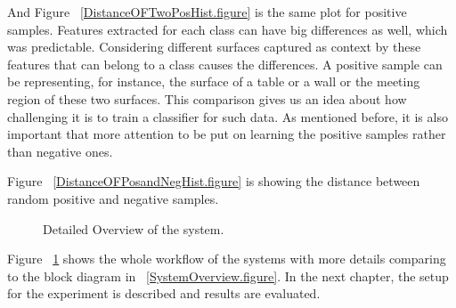 And Figure ~\ref{DistanceOFTwoPosHist.figure} is the same plot for positive samples. 
Features extracted for each class can have big differences as well, which was predictable. 
Considering different surfaces captured as context by these features that can belong to a class causes the differences. 
A positive sample can be representing, for instance, the surface of a table or a wall or the meeting region of these 
two surfaces. 
This comparison gives us an idea about how challenging it is to train a classifier for such data.
As mentioned before, it is also important that more attention to be put on learning the positive samples rather than 
negative ones. 



Figure ~\ref{DistanceOFPosandNegHist.figure} is showing the distance between random positive and negative samples.


\begin{figure}[t]
  \caption[Detailed Overview of the system]
  {Detailed Overview of the system.}
  \label{DetailedOverview.figure}
\end{figure}

Figure ~\ref{DetailedOverview.figure} shows the whole workflow of the systems with more details comparing to the block diagram in ~\ref{SystemOverview.figure}.
In the next chapter, the setup for the experiment is described and results are evaluated.


